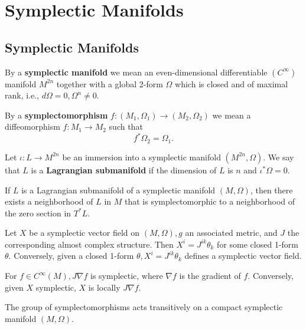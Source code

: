 \chapter{Symplectic Manifolds}

\section{Symplectic Manifolds}

\begin{definition}
    By a \textbf{symplectic manifold} we mean an even-dimensional differentiable $\left(C^{\infty}\right)$ manifold $M^{2 n}$ together with a global 2-form $\Omega$ which is closed and of maximal rank, i.e., $d \Omega=0, \Omega^n \neq 0$. 
    
    By a \textbf{symplectomorphism} $f:\left(M_1, \Omega_1\right) \longrightarrow\left(M_2, \Omega_2\right)$ we mean a diffeomorphism $f: M_1 \longrightarrow M_2$ such that 
    $$f^* \Omega_2=\Omega_1.$$
\end{definition}

\begin{definition}
    Let $\iota: L \longrightarrow M^{2 n}$ be an immersion into a symplectic manifold $\left(M^{2 n}, \Omega\right)$. We say that $L$ is a \textbf{Lagrangian submanifold} if the dimension of $L$ is $n$ and $\iota^* \Omega=0$.
\end{definition}

\begin{theorem}[Weistein]
    If $L$ is a Lagrangian submanifold of a symplectic manifold $(M, \Omega)$, then there exists a neighborhood of $L$ in $M$ that is symplectomorphic to a neighborhood of the zero section in $T^{*}L$.
\end{theorem}

\begin{theorem}
    Let $X$ be a symplectic vector field on $(M, \Omega), g$ an associated metric, and $J$ the corresponding almost complex structure. Then $X^i=J^{i k} \theta_k$ for some closed 1-form $\theta$. Conversely, given a closed 1-form $\theta, X^i=J^{i k} \theta_k$ defines a symplectic vector field.
\end{theorem}
\begin{corollary}
    For $f \in C^{\infty}(M), J \nabla f$ is symplectic, where $\nabla f$ is the gradient of $f$. Conversely, given $X$ symplectic, $X$ is locally $J \nabla f$.
\end{corollary}


\begin{theorem}[Hatakeyama, 1966]
    The group of symplectomorphisms acts transitively on a compact symplectic manifold $(M, \Omega)$.
\end{theorem}


